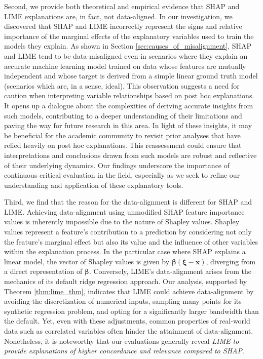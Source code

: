 \documentclass[mnsc,blindrev]{informs3}
\begin{document}
       Second, we provide both theoretical and empirical evidence that SHAP and LIME explanations are, in fact, not data-aligned. In our investigation, we discovered that SHAP and LIME incorrectly represent the signs and relative importance of the marginal effects of the explanatory variables used to train the models they explain. As shown in Section \ref{sec:causes_of_misalignment}, SHAP and LIME tend to be data-misaligned even in scenarios where they explain an accurate machine learning model trained on data whose features are mutually independent and whose target is derived from a simple linear ground truth model (scenarios which are, in a sense, ideal). This observation suggests a need for caution when interpreting variable relationships based on post hoc explanations. It opens up a dialogue about the complexities of deriving accurate insights from such models, contributing to a deeper understanding of their limitations and paving the way for future research in this area. In light of these insights, it may be beneficial for the academic community to revisit prior analyses that have relied heavily on post hoc explanations. This reassessment could ensure that interpretations and conclusions drawn from such models are robust and reflective of their underlying dynamics. Our findings underscore the importance of continuous critical evaluation in the field, especially as we seek to refine our understanding and application of these explanatory tools. %
        
        Third, we find that the reason for the data-alignment is different for SHAP and LIME. Achieving data-alignment using unmodified SHAP feature importance values is inherently impossible due to the nature of Shapley values. Shapley values represent a feature's contribution to a prediction by considering not only the feature's marginal effect but also its value and the influence of other variables within the explanation process. In the particular case where SHAP explains a linear model, the vector of Shapley values is given by $\boldsymbol{\beta}(\boldsymbol{\xi}-\bar{\mathbf{x}})$, diverging from a direct representation of $\boldsymbol{\beta}$. Conversely, LIME's data-alignment arises from the mechanics of its default ridge regression approach. Our analysis, supported by Theorem \ref{thm:lime_thm}, indicates that LIME could achieve data-alignment by avoiding the discretization of numerical inputs, sampling many points for its synthetic regression problem, and opting for a significantly larger bandwidth than the default. Yet, even with these adjustments, common properties of real-world data such as correlated variables often hinder the attainment of data-alignment. Nonetheless, it is noteworthy that our evaluations generally reveal \textit{LIME to provide explanations of higher concordance and relevance compared to SHAP}.
 
\end{document}
